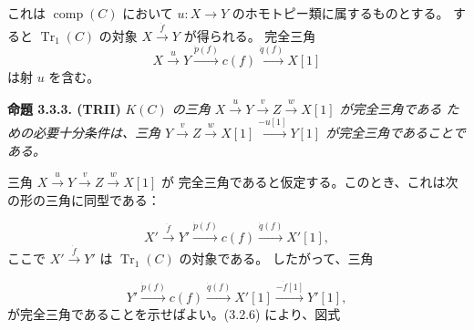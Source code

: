 \clearpage
{}%
\begingroup
\setlength{\abovedisplayskip}{3pt plus 2pt minus 2pt}%
\setlength{\belowdisplayskip}{3pt plus 2pt minus 2pt}%
これは $\operatorname{comp}(C)$ において
$u\colon X\to Y$ のホモトピー類に属するものとする。
すると $\operatorname{Tr}_1(C)$ の対象
$X\xrightarrow{\dot f}Y$ が得られる。
完全三角
\begin{equation*}
  X\xrightarrow{u}Y\xrightarrow{\dot p(f)}c(f)
  \xrightarrow{\dot q(f)}X[1]
\end{equation*}
は射 $u$ を含む。

\noindent\textbf{命題 3.3.3. (TRII)}\quad
{}
\textit{$K(C)$ の三角
$X\xrightarrow{u}Y\xrightarrow{v}Z\xrightarrow{w}X[1]$ が完全三角である
ための必要十分条件は、三角
$Y\xrightarrow{v}Z\xrightarrow{w}X[1]\xrightarrow{-u[1]}Y[1]$
が完全三角であることである。}

三角 $X\xrightarrow{u}Y\xrightarrow{v}Z\xrightarrow{w}X[1]$ が
完全三角であると仮定する。このとき、これは次の形の三角に同型である：

\begin{equation*}
  X'\xrightarrow{\dot f}Y'\xrightarrow{\dot p(f)}c(f)
  \xrightarrow{\dot q(f)}X'[1],
\end{equation*}
ここで $X'\xrightarrow{\dot f}Y'$ は $\operatorname{Tr}_1(C)$ の対象である。
したがって、三角

\begin{equation*}
  Y'\xrightarrow{\dot p(f)}c(f)\xrightarrow{\dot q(f)}X'[1]
  \xrightarrow{-\dot f[1]}Y'[1],
\end{equation*}
が完全三角であることを示せばよい。(3.2.6) により、図式

